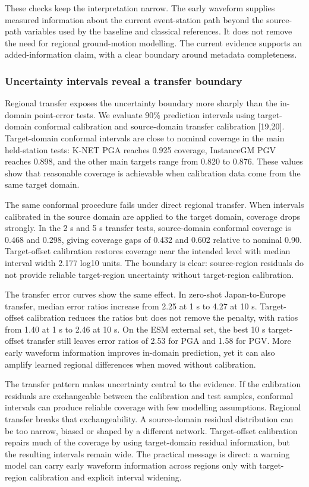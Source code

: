 \documentclass[
  10pt,
]{article}
\begin{document}
These checks keep the interpretation narrow. The early waveform supplies
measured information about the current event-station path beyond the
source-path variables used by the baseline and classical references. It
does not remove the need for regional ground-motion modelling. The
current evidence supports an added-information claim, with a clear
boundary around metadata completeness.

\subsubsection{Uncertainty intervals reveal a transfer
boundary}\label{uncertainty-intervals-reveal-a-transfer-boundary}

Regional transfer exposes the uncertainty boundary more sharply than the
in-domain point-error tests. We evaluate 90\% prediction intervals using
target-domain conformal calibration and source-domain transfer
calibration {[}19,20{]}. Target-domain conformal intervals are close to
nominal coverage in the main held-station tests: K-NET PGA reaches 0.925
coverage, InstanceGM PGV reaches 0.898, and the other main targets range
from 0.820 to 0.876. These values show that reasonable coverage is
achievable when calibration data come from the same target domain.

The same conformal procedure fails under direct regional transfer. When
intervals calibrated in the source domain are applied to the target
domain, coverage drops strongly. In the 2 s and 5 s transfer tests,
source-domain conformal coverage is 0.468 and 0.298, giving coverage
gaps of 0.432 and 0.602 relative to nominal 0.90. Target-offset
calibration restores coverage near the intended level with median
interval width 2.177 log10 units. The boundary is clear: source-region
residuals do not provide reliable target-region uncertainty without
target-region calibration.

The transfer error curves show the same effect. In zero-shot
Japan-to-Europe transfer, median error ratios increase from 2.25 at 1 s
to 4.27 at 10 s. Target-offset calibration reduces the ratios but does
not remove the penalty, with ratios from 1.40 at 1 s to 2.46 at 10 s. On
the ESM external set, the best 10 s target-offset transfer still leaves
error ratios of 2.53 for PGA and 1.58 for PGV. More early waveform
information improves in-domain prediction, yet it can also amplify
learned regional differences when moved without calibration.

The transfer pattern makes uncertainty central to the evidence. If the
calibration residuals are exchangeable between the calibration and test
samples, conformal intervals can produce reliable coverage with few
modelling assumptions. Regional transfer breaks that exchangeability. A
source-domain residual distribution can be too narrow, biased or shaped
by a different network. Target-offset calibration repairs much of the
coverage by using target-domain residual information, but the resulting
intervals remain wide. The practical message is direct: a warning model
can carry early waveform information across regions only with
target-region calibration and explicit interval widening.
\end{document}
